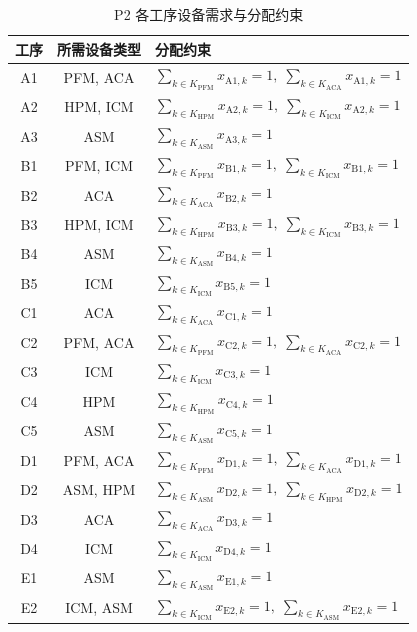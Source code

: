\documentclass[UTF8,a4paper,12pt]{ctexart}
\begin{document}
\begin{table}[htbp]
  \centering
  \caption{P2 各工序设备需求与分配约束}
  \label{tab:device_constraint}
  \begin{tabular}{ccl}
    \toprule
    工序 & 所需设备类型 & 分配约束 \\
    \midrule
    A1 & PFM, ACA & $\sum_{k \in K_{\text{PFM}}} x_{\text{A1},k} = 1, \; \sum_{k \in K_{\text{ACA}}} x_{\text{A1},k} = 1$ \\
    A2 & HPM, ICM & $\sum_{k \in K_{\text{HPM}}} x_{\text{A2},k} = 1, \; \sum_{k \in K_{\text{ICM}}} x_{\text{A2},k} = 1$ \\
    A3 & ASM & $\sum_{k \in K_{\text{ASM}}} x_{\text{A3},k} = 1$ \\
    B1 & PFM, ICM & $\sum_{k \in K_{\text{PFM}}} x_{\text{B1},k} = 1, \; \sum_{k \in K_{\text{ICM}}} x_{\text{B1},k} = 1$ \\
    B2 & ACA & $\sum_{k \in K_{\text{ACA}}} x_{\text{B2},k} = 1$ \\
    B3 & HPM, ICM & $\sum_{k \in K_{\text{HPM}}} x_{\text{B3},k} = 1, \; \sum_{k \in K_{\text{ICM}}} x_{\text{B3},k} = 1$ \\
    B4 & ASM & $\sum_{k \in K_{\text{ASM}}} x_{\text{B4},k} = 1$ \\
    B5 & ICM & $\sum_{k \in K_{\text{ICM}}} x_{\text{B5},k} = 1$ \\
    C1 & ACA & $\sum_{k \in K_{\text{ACA}}} x_{\text{C1},k} = 1$ \\
    C2 & PFM, ACA & $\sum_{k \in K_{\text{PFM}}} x_{\text{C2},k} = 1, \; \sum_{k \in K_{\text{ACA}}} x_{\text{C2},k} = 1$ \\
    C3 & ICM & $\sum_{k \in K_{\text{ICM}}} x_{\text{C3},k} = 1$ \\
    C4 & HPM & $\sum_{k \in K_{\text{HPM}}} x_{\text{C4},k} = 1$ \\
    C5 & ASM & $\sum_{k \in K_{\text{ASM}}} x_{\text{C5},k} = 1$ \\
    D1 & PFM, ACA & $\sum_{k \in K_{\text{PFM}}} x_{\text{D1},k} = 1, \; \sum_{k \in K_{\text{ACA}}} x_{\text{D1},k} = 1$ \\
    D2 & ASM, HPM & $\sum_{k \in K_{\text{ASM}}} x_{\text{D2},k} = 1, \; \sum_{k \in K_{\text{HPM}}} x_{\text{D2},k} = 1$ \\
    D3 & ACA & $\sum_{k \in K_{\text{ACA}}} x_{\text{D3},k} = 1$ \\
    D4 & ICM & $\sum_{k \in K_{\text{ICM}}} x_{\text{D4},k} = 1$ \\
    E1 & ASM & $\sum_{k \in K_{\text{ASM}}} x_{\text{E1},k} = 1$ \\
    E2 & ICM, ASM & $\sum_{k \in K_{\text{ICM}}} x_{\text{E2},k} = 1, \; \sum_{k \in K_{\text{ASM}}} x_{\text{E2},k} = 1$ \\
    \bottomrule
  \end{tabular}
\end{table}
\end{document}

